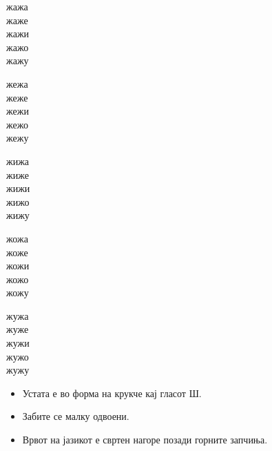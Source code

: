 \documentclass[a5paper,12pt]{article}
\newenvironment{instruction}{%
  \begin{tcolorbox}[colback=white,colframe=accentcolor,title={\textbf{Инструкции}},fonttitle=\bfseries] 
}{%
  \end{tcolorbox}
}
\begin{document}
\noindent
\begin{minipage}[t]{0.18\textwidth}
жажа\\ жаже\\ жажи\\ жажо\\ жажу
\end{minipage}
\hfill
\begin{minipage}[t]{0.18\textwidth}
жежа\\ жеже\\ жежи\\ жежо\\ жежу
\end{minipage}
\hfill
\begin{minipage}[t]{0.18\textwidth}
жижа\\ жиже\\ жижи\\ жижо\\ жижу
\end{minipage}
\hfill
\begin{minipage}[t]{0.18\textwidth}
жожа\\ жоже\\ жожи\\ жожо\\ жожу
\end{minipage}
\hfill
\begin{minipage}[t]{0.18\textwidth}
жужа\\ жуже\\ жужи\\ жужо\\ жужу
\end{minipage}

\begin{instruction}
  \begin{itemize}
    \item Устата е во форма на крукче кај гласот Ш.
    \item Забите се малку одвоени.
    \item Врвот на јазикот е свртен нагоре позади горните запчиња.
  \end{itemize}
\end{instruction}
\end{document}
